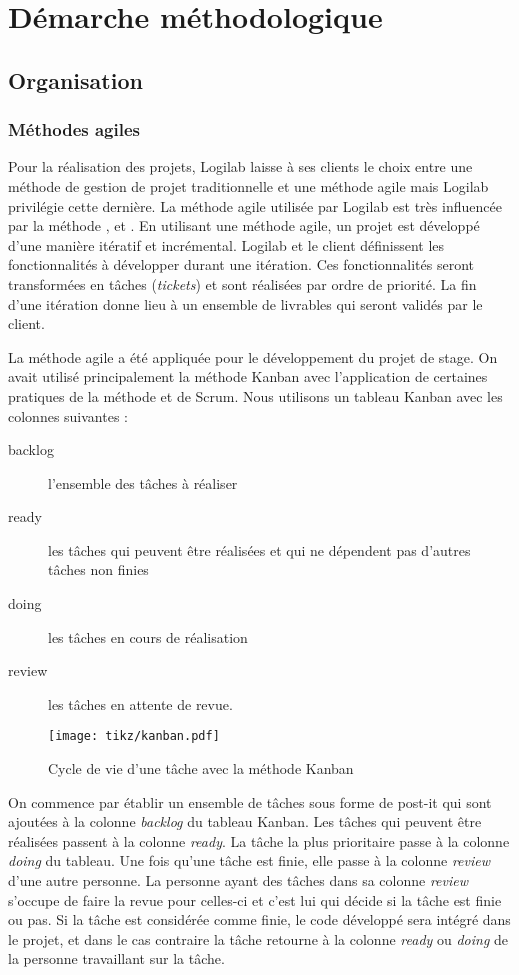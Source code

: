 \chapter{Démarche méthodologique}
\section{Organisation}
\subsection{Méthodes agiles}
Pour la réalisation des projets, Logilab laisse à ses clients le choix  entre une méthode de gestion de projet traditionnelle et une méthode agile mais Logilab privilégie cette dernière. La méthode agile utilisée par Logilab est très influencée par la méthode ,  et . En utilisant une méthode agile, un projet est développé d'une manière itératif et incrémental. Logilab et le client définissent les fonctionnalités à développer durant une itération. Ces fonctionnalités seront transformées en tâches (\textit{tickets}) et sont réalisées par ordre de priorité. La fin d'une itération donne lieu à un ensemble de livrables qui seront validés par le client. 

La méthode agile a été appliquée pour le développement du projet de stage. On avait utilisé principalement la méthode Kanban avec l'application de certaines pratiques de la méthode  et de Scrum. Nous utilisons un tableau Kanban avec les colonnes suivantes : 
\begin{description}
	\item[backlog] l'ensemble des tâches à réaliser
	\item[ready] les tâches qui peuvent être réalisées et qui ne dépendent pas d'autres tâches non finies
	\item[doing] les tâches en cours de réalisation
	\item[review] les tâches en attente de revue.
\end{description}
\begin{figure}
\centering
  \texttt{[image: tikz/kanban.pdf]}
  \caption{Cycle de vie d'une tâche avec la méthode Kanban}
  \label{fig:kanban}
\end{figure}
On commence par établir un ensemble de tâches sous forme de post-it qui sont ajoutées à la colonne \textit{backlog} du tableau Kanban. Les tâches qui peuvent être réalisées passent à la colonne \textit{ready}. La tâche la plus prioritaire passe à la colonne \textit{doing} du tableau. Une fois qu'une tâche est finie, elle passe à la colonne \textit{review} d'une autre personne. La personne ayant des tâches dans sa colonne \textit{review} s'occupe de faire la revue pour celles-ci et c'est lui qui décide si la tâche est finie ou pas. Si la tâche est considérée comme finie, le code développé sera intégré dans le projet, et dans le cas contraire la tâche retourne à la colonne \textit{ready} ou \textit{doing} de la personne travaillant sur la tâche. 

